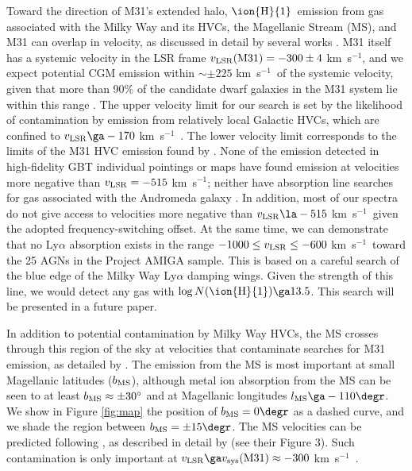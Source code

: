 \documentclass[12pt,preprint]{aastex6}
\newcommand{\HI}{\ensuremath{\mbox{\ion{H}{1}}}}
\newcommand{\logNHI}{\ensuremath{\log N(\mbox{\ion{H}{1}})}\relax}
\newcommand{\kms}{km~s$^{-1}$}
\newcommand{\vlsr}{\ensuremath{v_{\rm LSR}\relax}}
\begin{document}

Toward the direction of M31's extended halo, \HI\ emission from gas
associated with the Milky Way and its HVCs, the Magellanic Stream
(MS), and M31 can overlap in velocity, as discussed in detail by
several works .  M31 itself has a systemic velocity
in the LSR frame $\vlsr({\rm M31}) = -300\pm4$ \kms, and we expect
potential CGM emission within $\sim \pm225$ \kms\ of the systemic
velocity, given that more than 90\% of the candidate dwarf galaxies in
the M31 system lie within this range \citep{mcconnachie2012}.  The
upper velocity limit for our search is set by the likelihood of
contamination by emission from relatively local Galactic HVCs, which
are confined to $\vlsr \ga -170$ \kms\
\citep[][]{lehner2011a,lehner2012}. The lower
velocity limit corresponds to the limits of the M31 HVC emission found
by \citet{thilker2004}. None of the emission detected in high-fidelity
GBT individual pointings or maps \citep{thilker2004, lockman2012,
  wolfe2013, wolfe2016} have found emission at velocities more
negative than $\vlsr = -515$ \kms; neither have absorption line
searches for gas associated with the Andromeda galaxy
. In addition, most of our
spectra do not give access to velocities more negative than
$\vlsr \la -515$ \kms\ given the adopted frequency-switching
offset. At the same time, we can demonstrate that no Ly$\alpha$
absorption exists in the range $-1000 \le \vlsr \le -600$ \kms\ toward
the 25 AGNs in the Project AMIGA sample. This is based on a careful
search of the blue edge of the Milky Way Ly$\alpha$ damping
wings. Given the strength of this line, we would detect any gas with
$\logNHI \ga 13.5$. This search will be presented in a future paper.

In addition to potential contamination by Milky Way HVCs, the MS
crosses through this region of the sky at velocities that contaminate
searches for M31 emission, as detailed by \citetalias{lehner2015}
\citep[see also ][]{nidever2008, fox2014}. The emission from the MS is
most important at small Magellanic latitudes ($b_{\rm MS}$), although
metal ion absorption from the MS can be seen to at least
$b_{\rm MS}\approx\pm30^\circ$ \citep{fox2014} and at Magellanic
longitudes $l_{\rm MS} \ga -110\degr$. We show in Figure \ref{fig:map}
the position of $b_{\rm MS} = 0\degr$ as a dashed curve, and we shade
the region between $b_{\rm MS} = \pm15\degr$. The MS velocities can be
predicted following \citet{nidever2008}, as described in detail by
\citetalias{lehner2015} (see their Figure 3). Such contamination is
only important at $\vlsr \ga v_{\rm sys}({\rm M31}) \approx -300$
\kms\ \citep{de-vaucouleurs1991}.
\end{document}

